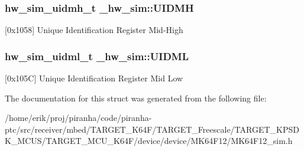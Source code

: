 \subsubsection[{\texorpdfstring{U\+I\+D\+MH}{UIDMH}}]{ {\bf hw\+\_\+sim\+\_\+uidmh\+\_\+t} \+\_\+hw\+\_\+sim\+::\+U\+I\+D\+MH}\hypertarget{struct__hw__sim_a5b21b77f424bb0e6222f6014bd4df8de}{}\label{struct__hw__sim_a5b21b77f424bb0e6222f6014bd4df8de}
\mbox{[}0x1058\mbox{]} Unique Identification Register Mid-\/\+High 
\subsubsection[{\texorpdfstring{U\+I\+D\+ML}{UIDML}}]{ {\bf hw\+\_\+sim\+\_\+uidml\+\_\+t} \+\_\+hw\+\_\+sim\+::\+U\+I\+D\+ML}\hypertarget{struct__hw__sim_a7395a45d8a00dd1a8c04ab5eec4623f4}{}\label{struct__hw__sim_a7395a45d8a00dd1a8c04ab5eec4623f4}
\mbox{[}0x105C\mbox{]} Unique Identification Register Mid Low 

The documentation for this struct was generated from the following file\+:\begin{DoxyCompactItemize}
\item 
/home/erik/proj/piranha/code/piranha-\/ptc/src/receiver/mbed/\+T\+A\+R\+G\+E\+T\+\_\+\+K64\+F/\+T\+A\+R\+G\+E\+T\+\_\+\+Freescale/\+T\+A\+R\+G\+E\+T\+\_\+\+K\+P\+S\+D\+K\+\_\+\+M\+C\+U\+S/\+T\+A\+R\+G\+E\+T\+\_\+\+M\+C\+U\+\_\+\+K64\+F/device/device/\+M\+K64\+F12/M\+K64\+F12\+\_\+sim.\+h\end{DoxyCompactItemize}
